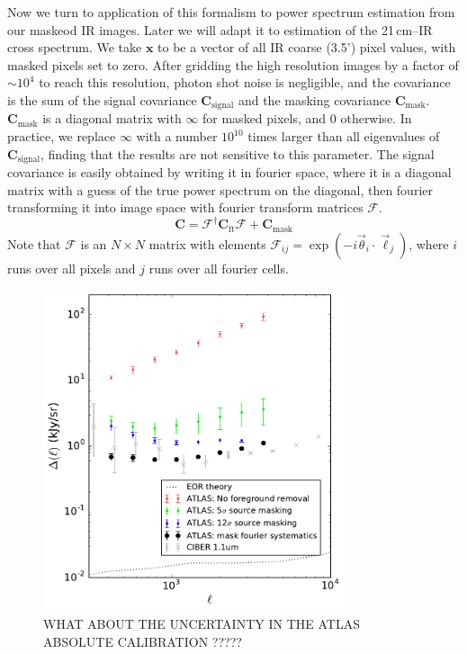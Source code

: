 \documentclass{emulateapj}
\newcommand{\Cb}{\mathbf{C}}
\newcommand{\xb}{\mathbf{x}}
\begin{document}
Now we turn to application of this formalism to power spectrum estimation from our maskeod IR images. Later we will adapt it to estimation of the 21\,cm--IR cross spectrum. We take $\xb$ to be a vector of all IR coarse (3.5') pixel values, with masked pixels set to zero. After gridding the high resolution images by a factor of $\sim10^4$ to reach this resolution, photon shot noise is negligible, and the covariance is the sum of the signal covariance $\Cb_\text{signal}$ and the masking covariance $\Cb_\text{mask}$. $\Cb_\text{mask}$ is a diagonal matrix with $\infty$ for masked pixels, and 0 otherwise. In practice, we replace $\infty$ with a number $10^10$ times larger than all eigenvalues of $\Cb_\text{signal}$, finding that the results are not sensitive to this parameter. The signal covariance is easily obtained by writing it in fourier space, where it is a diagonal matrix with a guess of the true power spectrum on the diagonal, then fourier transforming it into image space with fourier transform matrices $\mathcal{F}$. 
\begin{equation}
\label{eqn:covFTwithmask}
	\Cb = \mathcal{F}^\dagger\Cb_\text{ft}\mathcal{F}+\Cb_\text{mask}
\end{equation}
Note that $\mathcal{F}$ is an $N\times N$ matrix with elements $\mathcal{F}_{ij}=\exp(-i \vec{\theta}_i\cdot\vec{\ell}_j)$, where $i$ runs over all pixels and $j$ runs over all fourier cells. 

\begin{figure}[h]
\centering
\includegraphics[width=3.5in]{images/big_foreground_masking_study_pspecs_2_magoffset=20_56+0_274.pdf}
\caption{WHAT ABOUT THE UNCERTAINTY IN THE ATLAS ABSOLUTE CALIBRATION ?????}
\label{fig:bigfgmaskingstudypspecs}
\end{figure}
\end{document}
